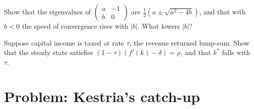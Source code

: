 \begin{exercise}[$\star\star\star$]\label{exo:b2:ramsey-model:11}
Show that the eigenvalues of $\begin{pmatrix} a & -1 \\ b & 0 \end{pmatrix}$ are $\tfrac12(a \pm \sqrt{a^2 - 4b})$, and that with $b < 0$ the speed of convergence rises with $|b|$. What lowers $|b|$?
\end{exercise}

\begin{exercise}[$\star\star\star$]\label{exo:b2:ramsey-model:12}
Suppose capital income is taxed at rate $\tau$, the revenue returned lump-sum. Show that the steady state satisfies $(1 - \tau)(f'(k) - \delta) = \rho$, and that $k^*$ falls with $\tau$.
\end{exercise}

\section{Problem: Kestria's catch-up}\label{sec:b2:ramsey-model:problem}

